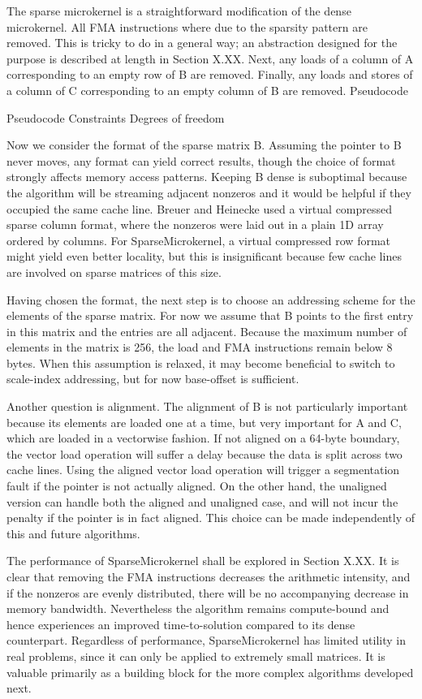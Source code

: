 The sparse microkernel is a straightforward modification of the dense microkernel. All FMA instructions  where  due to the sparsity pattern are removed. This is tricky to do in a general way; an abstraction designed for the purpose is described at length in Section X.XX. Next, any loads of a column of A corresponding to an empty row of B are removed. Finally, any loads and stores of a column of C corresponding to an empty column of B are removed. Pseudocode

Pseudocode
Constraints
Degrees of freedom


Now we consider the format of the sparse matrix B. Assuming the pointer to B never moves, any format can yield correct results, though the choice of format strongly affects memory access patterns. Keeping B dense is suboptimal because the algorithm will be streaming adjacent nonzeros and it would be helpful if they occupied the same cache line. Breuer and Heinecke used a virtual compressed sparse column format, where the nonzeros were laid out in a plain 1D array ordered by columns. For SparseMicrokernel, a virtual compressed row format might yield even better locality, but this is insignificant because few cache lines are involved on sparse matrices of this size. 

Having chosen the format, the next step is to choose an addressing scheme for the elements of the sparse matrix. For now we assume that B points to the first entry in this matrix and the entries are all adjacent. Because the maximum number of elements in the matrix is 256, the load and FMA instructions remain below 8 bytes. When this assumption is relaxed, it may become beneficial to switch to scale-index addressing, but for now base-offset is sufficient.

Another question is alignment. The alignment of B is not particularly important because its elements are loaded one at a time, but very important for A and C, which are loaded in a vectorwise fashion. If not aligned on a 64-byte boundary, the vector load operation will suffer a delay because the data is split across two cache lines. Using the aligned vector load operation  will trigger a segmentation fault if the pointer is not actually aligned. On the other hand, the unaligned version  can handle both the aligned and unaligned case, and will not incur the penalty if the pointer is in fact aligned. This choice can be made independently of this and future algorithms.

The performance of SparseMicrokernel shall be explored in Section X.XX. It is clear that removing the FMA instructions decreases the arithmetic intensity, and if the nonzeros are evenly distributed, there will be no accompanying decrease in memory bandwidth. Nevertheless the algorithm remains compute-bound and hence experiences an improved time-to-solution compared to its dense counterpart. Regardless of performance, SparseMicrokernel has limited utility in real problems, since it can only be applied to extremely small matrices. It is valuable primarily as a building block for the more complex algorithms developed next.

